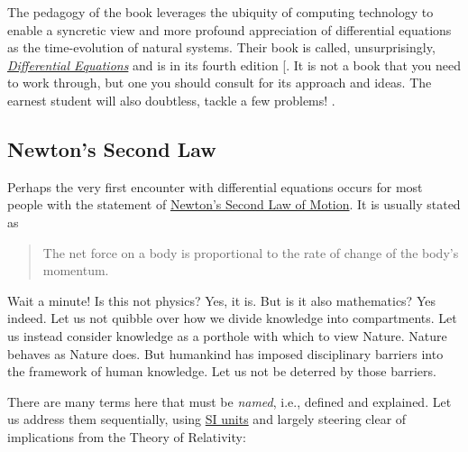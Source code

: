 \documentclass[
  a4paper,
]{article}
\begin{document}
The pedagogy of the book leverages the ubiquity of computing technology
to enable a syncretic view and more profound appreciation of
differential equations as the time-evolution of natural systems. Their
book is called, unsurprisingly,
\href{http://math.bu.edu/odes/4ed-TOC.html}{\emph{Differential
Equations}} and is in its fourth edition
{[}\citeproc{ref-blanchard-devaney-hall-2012}{2}{]}. It is not a book
that you need to work through, but one you should consult for its
approach and ideas. The earnest student will also doubtless, tackle a
few problems!  \normalfont.

\subsection{Newton's Second Law}\label{newtons-second-law}

Perhaps the very first encounter with differential equations occurs for
most people with the statement of
\href{https://www.britannica.com/science/Newtons-laws-of-motion/Newtons-second-law-F-ma}{Newton's
Second Law of Motion}. It is usually stated as

\begin{quote}
The net force on a body is proportional to the rate of change of the
body's momentum.
\end{quote}

Wait a minute! Is this not physics? Yes, it is. But is it also
mathematics? Yes indeed. Let us not quibble over how we divide knowledge
into compartments. Let us instead consider knowledge as a porthole with
which to view Nature. Nature behaves as Nature does. But humankind has
imposed disciplinary barriers into the framework of human knowledge. Let
us not be deterred by those barriers.

There are many terms here that must be \emph{named}, i.e., defined and
explained. Let us address them sequentially, using
\href{https://en.wikipedia.org/wiki/International_System_of_Units}{SI
units} and largely steering clear of implications from the Theory of
Relativity:
\end{document}
